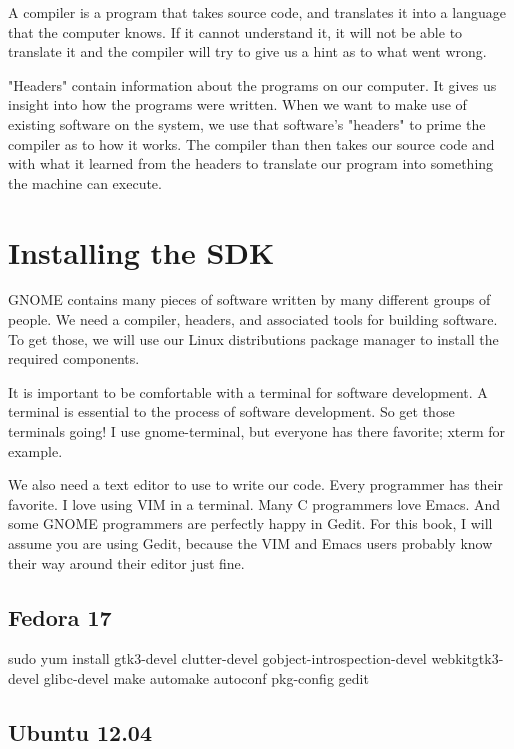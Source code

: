A compiler is a program that takes source code, and translates it into a
language that the computer knows. If it cannot understand it, it will not be
able to translate it and the compiler will try to give us a hint as to what
went wrong.

"Headers" contain information about the programs on our computer.  It gives us
insight into how the programs were written. When we want to make use of
existing software on the system, we use that software's "headers" to prime the
compiler as to how it works. The compiler than then takes our source code and
with what it learned from the headers to translate our program into something
the machine can execute.


\section{Installing the SDK}

GNOME contains many pieces of software written by many different groups of
people. We need a compiler, headers, and associated tools for building
software. To get those, we will use our Linux distributions package manager to
install the required components.

It is important to be comfortable with a terminal for software development. A
terminal is essential to the process of software development. So get those
terminals going! I use gnome-terminal, but everyone has there favorite; xterm
for example.

We also need a text editor to use to write our code. Every programmer has their
favorite. I love using VIM in a terminal. Many C programmers love Emacs. And
some GNOME programmers are perfectly happy in Gedit. For this book, I will
assume you are using Gedit, because the VIM and Emacs users probably know their
way around their editor just fine.


\subsection{Fedora 17}

\begin{Terminal}
sudo yum install gtk3-devel clutter-devel gobject-introspection-devel webkitgtk3-devel glibc-devel make automake autoconf pkg-config gedit
\end{Terminal}


\subsection{Ubuntu 12.04}

